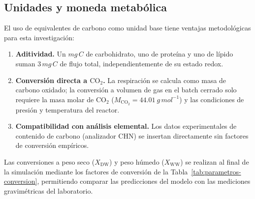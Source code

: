 \subsection{Unidades y moneda metabólica}

El uso de equivalentes de carbono como unidad base tiene ventajas metodológicas para esta investigación:
\begin{enumerate}
    \item \textbf{Aditividad.} Un $\si{mg\,C}$ de carbohidrato, uno de proteína y uno de lípido suman $3\,\si{mg\,C}$ de flujo total, independientemente de su estado redox.
    \item \textbf{Conversión directa a $\mathrm{CO_2}$.} La respiración se calcula como masa de carbono oxidado; la conversión a volumen de gas en el batch cerrado solo requiere la masa molar de $\mathrm{CO_2}$ ($M_{\mathrm{CO_2}}=\SI{44.01}{g\,mol^{-1}}$) y las condiciones de presión y temperatura del reactor.
    \item \textbf{Compatibilidad con análisis elemental.} Los datos experimentales de contenido de carbono (analizador CHN) se insertan directamente sin factores de conversión empíricos.
\end{enumerate}

Las conversiones a peso seco ($X_{\mathrm{DW}}$) y peso húmedo ($X_{\mathrm{WW}}$) se realizan al final de la simulación mediante los factores de conversión de la Tabla~\ref{tab:parametros-conversion}, permitiendo comparar las predicciones del modelo con las mediciones gravimétricas del laboratorio.

